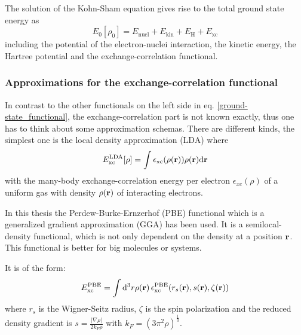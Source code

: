 	
	The solution of the Kohn-Sham equation gives rise to the total ground state energy as 
	\begin{equation} \label{ground-state_functional}
		E_0 [\rho_0] = E_{\text{nucl}} + E_{\text{kin}} + E_\text{H} + E_{\text{xc}} 
	\end{equation}
	including the potential of the electron-nuclei interaction, the kinetic energy, the Hartree potential and the exchange-correlation functional.
	
	\subsubsection{Approximations for the exchange-correlation functional} \label{xc-func}
		In contrast to the other functionals on the left side in eq. \eqref{ground-state_functional}, the exchange-correlation part is not known exactly, thus one has to think about some approximation schemas.
		There are different kinds, the simplest one is the local density approximation (LDA) where 
		\begin{equation}
		E_{\text{xc}}^{\text{LDA}}[\rho] = \int \epsilon_{\text{xc}} (\rho(\textbf{r})) \rho(\textbf{r}) \mathrm{d} \textbf{r}
		\end{equation} 
		with the many-body exchange-correlation energy per electron $\epsilon_{xc}(\rho)$ of a uniform gas with density $\rho(\textbf{r})$ of interacting electrons.
		
		In this thesis the Perdew-Burke-Ernzerhof (PBE) functional which is a generalized gradient approximation (GGA) has been used. It is a semilocal-density functional, which is not only dependent on the density at a position $\textbf{r}$. This functional is better for big molecules or systems.
		
		It is of the form:
		\begin{equation}
			E_{\text{xc}}^{\text{PBE}} = \int \mathrm{d}^3 r \rho(\textbf{r}) 
			\,\epsilon_{\text{xc}}^{\text{PBE}} (r_s (\textbf{r}), s(\textbf{r}), \zeta(\textbf{r}))
		\end{equation}
		where $r_s$ is the Wigner-Seitz radius, $\zeta$ is the spin polarization and the reduced density gradient is $s=\frac{|\nabla \rho|}{2 k_F \rho}$ with $k_F = (3 \pi^2 \rho)^{\frac{1}{3}}$. 
